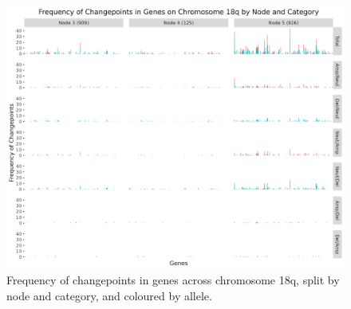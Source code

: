 \begin{figure}[!htb]
\centering
\includegraphics[width = 1\textwidth]{../figures/Chapter_6/Chromosome_18q_Barplot_Node.png}
\caption[Frequency of changepoints in genes across chromosome 18q, split by node and category, and coloured by allele.]{Frequency of changepoints in genes across chromosome 18q, split by node and category, and coloured by allele.}
\label{fig:Barplot_18q}
\end{figure}
